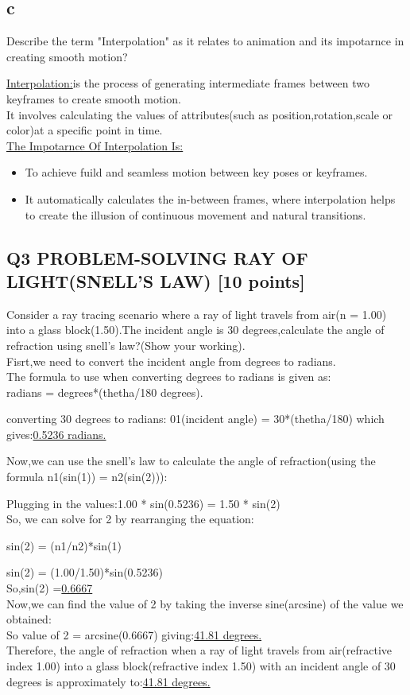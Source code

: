 \documentclass{article}
\begin{document}
\subsection{c}Describe the term "Interpolation" as it relates to animation and its impotarnce in creating smooth motion?\par
\underline{Interpolation:}is the process of generating intermediate frames between two keyframes to create smooth motion.\\
It involves calculating the values of attributes(such as position,rotation,scale or color)at a specific point in time.\\
\underline{The Impotarnce Of Interpolation Is:}\\
\begin{itemize}
    \item To achieve fuild and seamless motion between key poses or keyframes.
    \item It automatically calculates the in-between frames, where interpolation helps to create the illusion of continuous movement and natural transitions.
\end{itemize}

\subsection{Q3 PROBLEM-SOLVING RAY OF LIGHT(SNELL'S LAW) [10 points]}Consider a ray tracing scenario where a ray of light travels from air(n = 1.00) into a glass block(1.50).The incident angle is 30 degrees,calculate the angle of refraction using snell's law?(Show your working).\\
Fisrt,we need to convert the incident angle from degrees to radians.\\The formula to use when converting degrees to radians is given as:\\
radians = degrees*(thetha/180 degrees).\par
converting 30 degrees to radians: 01(incident angle) = 30*(thetha/180) which gives:\underline{0.5236 radians.}\par
Now,we can use the snell's law to calculate the angle of refraction(using the formula n1(sin(1)) = n2(sin(2))):\par
Plugging in the values:1.00 * sin(0.5236) = 1.50 * sin(2)\\
So, we can solve for 2 by rearranging the equation:\par
sin(2) = (n1/n2)*sin(1)\par
sin(2) = (1.00/1.50)*sin(0.5236)\\
So,sin(2) =\underline{0.6667}\\
Now,we can find the value of 2 by taking the inverse sine(arcsine) of the value we obtained:\\
So value of 2 = arcsine(0.6667) giving:\underline{41.81 degrees.}\\
Therefore, the angle of refraction when a ray of light travels from air(refractive index 1.00) into a glass block(refractive index 1.50) with an incident angle of 30 degrees is approximately to:\underline{41.81 degrees.} 
\end{document}
